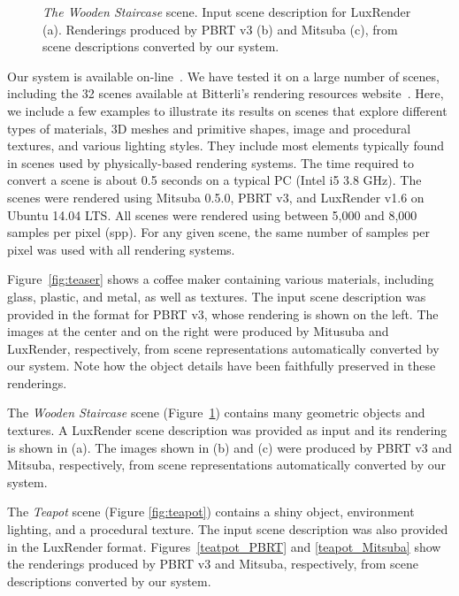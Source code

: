\begin{figure}[h!t]
{		\label{staircase_Mitsuba}
	}
	\caption{\textit{The Wooden Staircase} scene. Input scene description for LuxRender (a).
		Renderings produced by PBRT v3 (b) and Mitsuba (c),
		from scene descriptions converted by our system. }
	\label{fig:staircase}
\end{figure}

Our system is available on-line~\cite{sceneConverter}.
We have tested it on a large number of scenes, including the 32 scenes available
at Bitterli's rendering resources website~\cite{resources16}. 
Here, we include a few examples to illustrate its results on scenes that explore different 
types of materials, 3D meshes and primitive shapes, image and 
procedural textures, and various lighting styles. They include most elements typically found in scenes used by physically-based rendering systems.  The time required to convert a scene is about 0.5 seconds on a typical PC (Intel i5 3.8 GHz).
% 
%
The scenes were rendered using Mitsuba 0.5.0, PBRT v3, and LuxRender v1.6 on 
Ubuntu 14.04 LTS. All scenes were rendered using between 5,000 and 8,000 samples per pixel (spp). For any given scene,
the same number of samples per pixel was used with all rendering systems. 

Figure~\ref{fig:teaser} shows a coffee maker containing various materials, including glass, plastic, and metal, as well as textures. The input scene description was provided in the format for PBRT v3, whose rendering is shown on the left. The images at the center and on the right were produced by Mitusuba and LuxRender, respectively, from scene representations automatically converted by our system. 
Note how the object details have been faithfully preserved in these renderings.

The \textit{Wooden Staircase} scene (Figure~\ref{fig:staircase}) contains many geometric objects and textures. 
A LuxRender scene description was provided as input and its rendering is shown in (a). The images shown in (b) and (c) were produced 
by PBRT v3 and Mitsuba, respectively, from scene representations automatically converted by our system. 

The \textit{Teapot} scene (Figure \ref{fig:teapot}) contains a shiny object, environment lighting, and a procedural texture. The input scene description was also provided in the LuxRender format. Figures~\ref{teatpot_PBRT} and \ref{teapot_Mitsuba} show the renderings produced by PBRT v3 and Mitsuba, respectively, from scene descriptions converted by our system.

